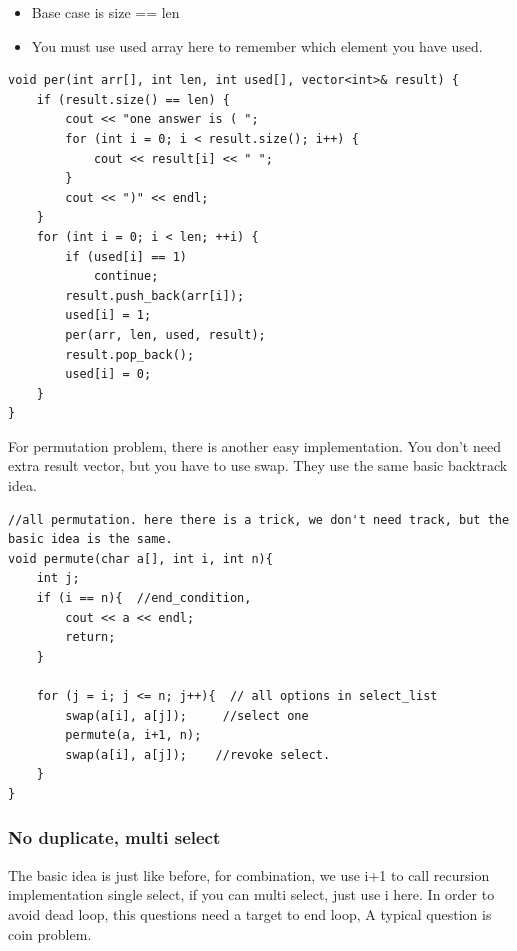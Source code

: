 \documentclass[a4paper,11pt,twoside]{book}
\begin{document}
\begin{itemize}
	\item Base case is size == len
	\item You must use used array here to remember which element you have used. 
\end{itemize}
\begin{lstlisting}
void per(int arr[], int len, int used[], vector<int>& result) {
	if (result.size() == len) {
		cout << "one answer is ( ";
		for (int i = 0; i < result.size(); i++) {
			cout << result[i] << " ";
		}
		cout << ")" << endl;
	}
	for (int i = 0; i < len; ++i) {
		if (used[i] == 1)
			continue;
		result.push_back(arr[i]); 
		used[i] = 1;
		per(arr, len, used, result);
		result.pop_back();
		used[i] = 0;
	}
}	
\end{lstlisting}
	\par For permutation problem, there is another easy implementation. You don't need extra result vector, but you have to use swap. They use the same basic backtrack idea.
\begin{lstlisting}
//all permutation. here there is a trick, we don't need track, but the basic idea is the same. 
void permute(char a[], int i, int n){
	int j;
	if (i == n){  //end_condition, 
		cout << a << endl;
		return;
	}
	
	for (j = i; j <= n; j++){  // all options in select_list
		swap(a[i], a[j]);     //select one
		permute(a, i+1, n);
		swap(a[i], a[j]);    //revoke select.
	}
} 	
\end{lstlisting}



\subsubsection{No duplicate, multi select}

	\par The basic idea is just like before, for combination, we use i+1 to call recursion implementation single select, if you can multi select, just use i here. In order to avoid dead loop, this questions need a target to end loop, A typical question is coin problem.
	
\end{document}
